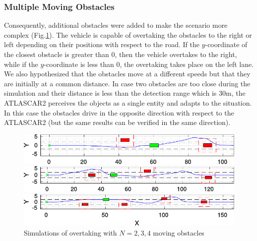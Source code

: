 \documentclass[conference, 11pt]{IEEEtran}
\begin{document}
\subsubsection{Multiple Moving Obstacles}
Consequently, additional obstacles were added to make the scenario more complex (Fig.\ref{fig:obstacleAvoidance_random}). The vehicle is capable of overtaking the obstacles to the right or left depending on their positions with respect to the road. If the $y$-coordinate of the closest obstacle is greater than 0, then the vehicle overtakes to the right, while if the $y$-coordinate is less than 0, the overtaking takes place on the left lane. We also hypothesized that the obstacles move at a different speeds but that they are initially at a common distance. In case two obstacles are too close during the simulation and their distance is less than the detection range which is $30$m, the ATLASCAR2 perceives the objects as a single entity and adapts to the situation. In this case the obstacles drive in the opposite direction with respect to the ATLASCAR2 (but the same results can be verified in the same direction).
\begin{figure}[H]
	\centering
	\begin{minipage}[t]{\columnwidth}
	\includegraphics[width=1\columnwidth]{../../MATLAB/random_N_obstacles/figure/overtaking_random_2.pdf}
	\end{minipage}
	\begin{minipage}[t]{\columnwidth}
	\includegraphics[width=1\columnwidth]{../../MATLAB/random_N_obstacles/figure/overtaking_random.pdf}
	\end{minipage}
	\begin{minipage}[t]{\columnwidth}
	\includegraphics[width=1\columnwidth]{../../MATLAB/random_N_obstacles/figure/overtaking_random_1.pdf}
	\end{minipage}
	\vspace{-20pt}
	\caption{Simulations of overtaking with $N = 2,3,4$ moving obstacles}
	\label{fig:obstacleAvoidance_random}
\end{figure}
\end{document}
